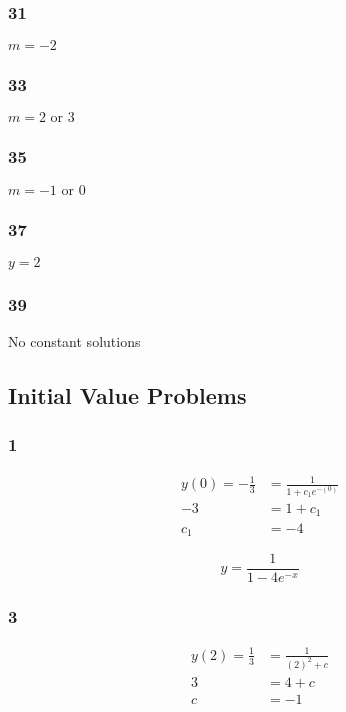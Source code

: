 \documentclass{article}
\begin{document}
\subsubsection{31}

$m = -2$

\subsubsection{33}

$m = 2 \text{ or } 3$

\subsubsection{35}

$m = -1 \text{ or } 0$

\subsubsection{37}

$y = 2$

\subsubsection{39}

No constant solutions

\subsection{Initial Value Problems}

\subsubsection{1}

\begin{align*}
  y(0) = -\frac{1}{3} & = \frac{1}{1 + c_1 e^{-(0)}} \\
  -3                  & = 1 + c_1                    \\
  c_1                 & = -4
\end{align*}

\[y = \frac{1}{1 - 4 e^{-x}}\]

\subsubsection{3}

\begin{align*}
  y(2) = \frac{1}{3} & = \frac{1}{(2)^2 + c} \\
  3                  & = 4 + c               \\
  c                  & = -1
\end{align*}
\end{document}
